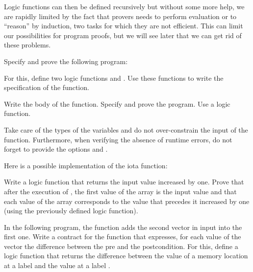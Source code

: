 Logic functions can then be defined recursively but without some more
help, we are rapidly limited by the fact that provers needs to
perform evaluation or to ``reason'' by induction, two tasks for which
they are not efficient. This can limit our possibilities for program
proofs, but we will see later that we can get rid of these problems.







Specify and prove the following program:






For this, define two logic functions  and .
Use these functions to write the specification of the function.





Write the body of the  function. Specify and prove the
program. Use a  logic function.




Take care of the types of the variables and do not over-constrain the input of
the function. Furthermore, when verifying the absence of runtime errors, do not
forget to provide the options  and
.




Here is a possible implementation of the iota function:




Write a logic function that returns the input value increased by one. Prove
that after the execution of , the first value of the array is
the input value and that each value of the array corresponds to the value that
precedes it increased by one (using the previously defined logic function).






In the following program, the  function adds the second
vector in input into the first one. Write a contract for the function
 that expresses, for each value of the vector
 the difference between the pre and the postcondition. For this,
define a logic function  that returns the difference between
the value of a memory location at a label  and the value at a
label .


